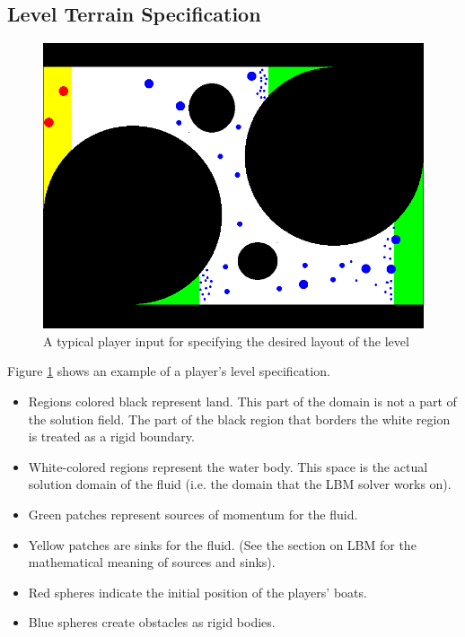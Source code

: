 \subsection{Level Terrain Specification}

\begin{figure}
\centering
  \includegraphics[scale=0.4]{img/ImageProcessing/LevelImages/img_0.png}
\caption{A typical player input for specifying the desired layout of the level\label{fig:LevelInput}}
\end{figure}

Figure \ref{fig:LevelInput} shows an example of a player's level specification.
\begin{itemize}
	\item Regions colored black represent land. This part of the domain is not a part of the solution field. The part of the black region that borders the white region is treated as a rigid boundary.
	\item White-colored regions represent the water body. This space is the actual solution domain of the fluid (i.e. the domain that the LBM solver works on).
	\item Green patches represent sources of momentum for the fluid.
	\item Yellow patches are sinks for the fluid. (See the section on LBM for the mathematical meaning of sources and sinks).
	\item Red spheres indicate the initial position of the players' boats.
	\item Blue spheres create obstacles as rigid bodies.
\end{itemize}
